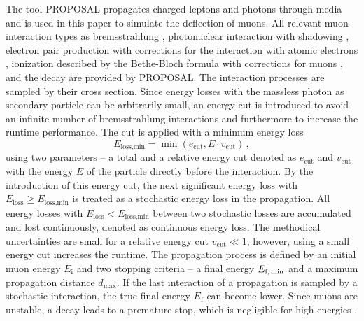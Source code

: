 The tool PROPOSAL \cite{koehne2013proposal, dunsch_2018_proposal_improvements} propagates charged leptons and photons through media and is 
used in this paper to simulate the deflection of muons. All relevant muon interaction types 
as bremsstrahlung \cite{KKP_1995, Bremsstrahlung_KKP}, photonuclear interaction \cite{Abramowicz_1997} with 
shadowing \cite{ButkevichMikheyev_2002}, electron pair production \cite{epair_kokoulin_petrukhin} with corrections for the 
interaction with atomic electrons \cite{epair_kelner}, 
ionization described by the Bethe-Bloch formula with corrections for muons \cite{Rossi}, 
and the decay are provided by PROPOSAL. The interaction processes are sampled by their cross section.
Since energy losses
with the massless photon as secondary particle can be arbitrarily small, an energy cut is introduced to avoid an infinite number of bremsstrahlung interactions 
and furthermore to increase the runtime performance. 
The cut is applied with a minimum energy loss
\begin{equation}
    E_{\text{loss,min}} = \min{(e_{\mathrm{cut}}, E \cdot v_{\mathrm{cut}})}\,,
\end{equation}
using two parameters -- a total and a relative energy cut denoted as 
$e_{\mathrm{cut}}$ and $v_{\mathrm{cut}}$ with the energy $E$ of the particle 
directly before the interaction. 
By the introduction of 
this energy cut, the next significant energy loss with 
$E_{\mathrm{loss}} \geq E_{\text{loss,min}}$ 
is treated as a stochastic energy loss in the propagation. 
All energy losses with $E_{\mathrm{loss}} < E_{\text{loss,min}}$ between 
two stochastic losses are accumulated and lost continuously, denoted 
as continuous energy loss.
The methodical uncertainties are small 
for a relative energy cut $v_{\mathrm{cut}}\ll 1$, however, using a small energy 
cut increases the runtime.
The 
propagation process is defined by an initial muon energy $E_{\text{i}}$ and 
two stopping criteria -- a final energy $E_{\text{f,\,min}}$ and a 
maximum propagation distance $d_{\text{max}}$. If the last interaction of 
a propagation is sampled by a stochastic interaction, the true final energy 
$E_{\text{f}}$ can become lower. 
Since muons are unstable, a decay leads to a premature 
stop, which is negligible for high energies \cite{phd_soedingrekso}.

